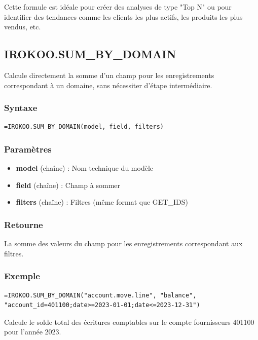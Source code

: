 \documentclass[12pt, a4paper]{article}
\begin{document}
\begin{tip}
Cette formule est idéale pour créer des analyses de type "Top N" ou pour identifier des tendances comme les clients les plus actifs, les produits les plus vendus, etc.
\end{tip}

\subsection{IROKOO.SUM\_BY\_DOMAIN}
\begin{tcolorbox}[title=Description]
Calcule directement la somme d'un champ pour les enregistrements correspondant à un domaine, sans nécessiter d'étape intermédiaire.
\end{tcolorbox}

\subsubsection{Syntaxe}
\begin{lstlisting}
=IROKOO.SUM_BY_DOMAIN(model, field, filters)
\end{lstlisting}

\subsubsection{Paramètres}
\begin{itemize}
    \item \textbf{model} (chaîne) : Nom technique du modèle
    \item \textbf{field} (chaîne) : Champ à sommer
    \item \textbf{filters} (chaîne) : Filtres (même format que GET\_IDS)
\end{itemize}

\subsubsection{Retourne}
La somme des valeurs du champ pour les enregistrements correspondant aux filtres.

\subsubsection{Exemple}
\begin{lstlisting}
=IROKOO.SUM_BY_DOMAIN("account.move.line", "balance", "account_id=401100;date>=2023-01-01;date<=2023-12-31")
\end{lstlisting}
Calcule le solde total des écritures comptables sur le compte fournisseurs 401100 pour l'année 2023.
\end{document}
